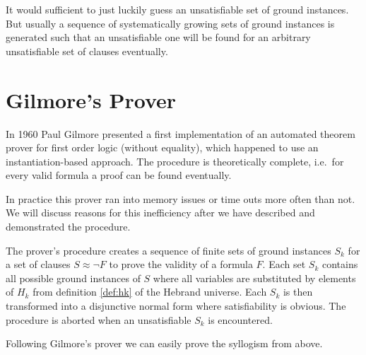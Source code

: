 It would sufficient to just luckily guess an unsatisfiable set of ground instances. 
But usually a sequence of systematically growing sets of ground instances is generated 
such that an unsatisfiable one will be found 
for an arbitrary unsatisfiable set of clauses
eventually.



%
%
%
%
%




\section{Gilmore's Prover}

In 1960 Paul Gilmore presented a first {\myem implementation} of an automated 
theorem prover \cite{5392528} for first order logic (without equality),
which happened to use an instantiation-based approach. 
The procedure is theoretically complete, i.e.~for every valid formula 
a proof can be found eventually.

In practice this prover ran into memory issues or time outs more often than not.
We will discuss reasons for this inefficiency after we have described and demonstrated the procedure.

The prover's procedure 
creates a sequence of finite sets of ground instances $S_k$ 
for a set of clauses $S\approx\lnot F$ to prove the validity of a formula $F$.
Each set $S_k$ contains all possible ground instances of $S$ 
where all variables are substituted by elements of $H_k$
from definition \ref{def:hk} of the Hebrand universe.
Each $S_k$ is then transformed into a disjunctive normal form where satisfiability is obvious.
The procedure is aborted when an unsatisfiable $S_k$ is encountered.

Following Gilmore's prover we can easily prove the syllogism from above.

